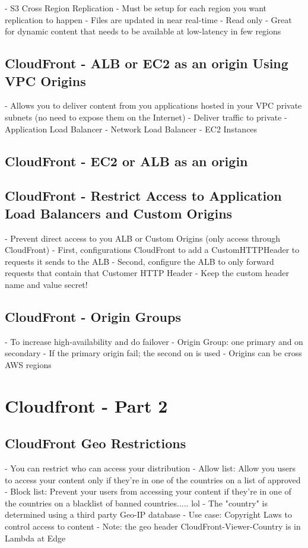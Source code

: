 \documentclass[11pt]{book}
\begin{document}
    - S3 Cross Region Replication
    - Must be setup for each region you want replication to happen
    - Files are updated in near real-time
    - Read only
    - Great for dynamic content that needs to be available at low-latency in few regions

    \subsection{CloudFront - ALB or EC2 as an origin Using VPC Origins}
    - Allows you to deliver content from you applications hosted in your VPC private subnets (no need to expose them on the Internet)
    - Deliver traffic to private
    - Application Load Balancer
    - Network Load Balancer
    - EC2 Instances


    \subsection{CloudFront - EC2 or ALB as an origin}

    \subsection{CloudFront - Restrict Access to Application Load Balancers and Custom Origins}
    - Prevent direct access to you ALB or Custom Origins (only access through CloudFront)
    - First, configurations CloudFront to add a CustomHTTPHeader to requests it sends to the ALB
    - Second, configure the ALB to only forward requests that contain that Customer HTTP Header
    - Keep the custom header name and value secret!


    \subsection{CloudFront - Origin Groups}
    - To increase high-availability and do failover
    - Origin Group: one primary and on secondary
    - If the primary origin fail; the second on is used
    - Origins can be cross AWS regions



    \section{Cloudfront - Part 2}

    \subsection{CloudFront Geo Restrictions}
    - You can restrict who can access your distribution
    - Allow list: Allow you users to access your content only if they're in one of the countries on a list of approved
    - Block list: Prevent your users from accessing your content if they're in one of the countries on a blacklist of banned countries..... lol
    - The "country" is determined using a third party Geo-IP database
    - Use case: Copyright Laws to control access to content
    - Note: the geo header CloudFront-Viewer-Country is in Lambda at Edge
\end{document}
